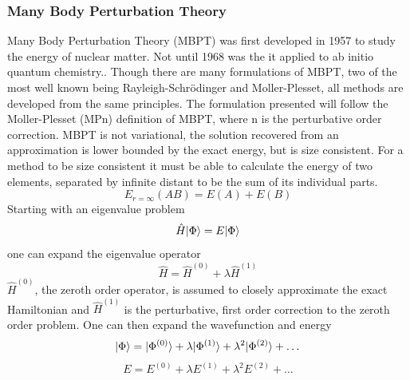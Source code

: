     \subsubsection{Many Body Perturbation Theory}
      Many Body Perturbation Theory (MBPT) was first developed in 1957\cite{Brueckner1955} to study the energy of nuclear matter.  Not until 1968 was the it applied to ab initio quantum chemistry.\cite{Freed1968,Freed1971}.  Though there are many formulations of MBPT, two of the most well known being Rayleigh-Schr{\"o}dinger\cite{Lindgren1974} and M{\/o}ller-Plesset\cite{Moller1934, Raghavachari1989}, all methods are developed from the same principles.  %
      The formulation presented will follow the M{\/o}ller-Plesset (MPn) definition of MBPT, where n is the perturbative order correction. 
      MBPT is not variational, the solution recovered from an approximation is lower bounded by the exact energy, but is size consistent.       %
      For a method to be size consistent it must be able to calculate the energy of two elements, separated by infinite distant to be the sum of its individual parts.  
        \begin{equation}
        	E_{r=\infty}(AB) = E(A) + E(B)
        \end{equation}
      Starting with an eigenvalue problem
        \begin{equation} \label{eigenvalue}
        	\hat{H}| \Phi \rangle =  E| \Phi \rangle
        \end{equation}
      one can expand the eigenvalue operator
      \begin{equation}
      	\hat{H} = \hat{H}^{(0)} + \lambda \hat{H}^{(1)}
      \end{equation}
      $\hat{H}^{(0)}$, the zeroth order operator, is assumed to closely approximate the exact Hamiltonian and $\hat{H}^{(1)}$ is the perturbative, first order correction to the zeroth order problem. One can then expand the wavefunction and energy
        \begin{equation}
        	| \Phi \rangle = | \Phi^{(0)} \rangle + \lambda | \Phi^{(1)} \rangle +  \lambda^2 | \Phi^{(2)} \rangle + \dots\\
        \end{equation}
        \begin{equation}
        	E = E^{(0)} + \lambda E^{(1)} + \lambda^2 E^{(2)} + \dots
        \end{equation}
